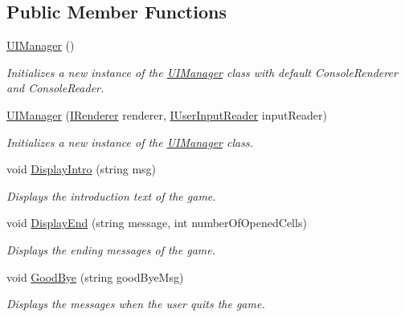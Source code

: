 \subsection*{Public Member Functions}
\begin{DoxyCompactItemize}
\item 
\hyperlink{class_minesweeper_1_1_game_1_1_u_i_manager_a424a2a585050b3c85d119d84c4ba2b80}{U\+I\+Manager} ()
\begin{DoxyCompactList}\small\item\em Initializes a new instance of the \hyperlink{class_minesweeper_1_1_game_1_1_u_i_manager}{U\+I\+Manager} class with default Console\+Renderer and Console\+Reader. \end{DoxyCompactList}\item 
\hyperlink{class_minesweeper_1_1_game_1_1_u_i_manager_a996444e4a3c298158ab07d21f48c7307}{U\+I\+Manager} (\hyperlink{interface_minesweeper_1_1_lib_1_1_i_renderer}{I\+Renderer} renderer, \hyperlink{interface_minesweeper_1_1_lib_1_1_i_user_input_reader}{I\+User\+Input\+Reader} input\+Reader)
\begin{DoxyCompactList}\small\item\em Initializes a new instance of the \hyperlink{class_minesweeper_1_1_game_1_1_u_i_manager}{U\+I\+Manager} class. \end{DoxyCompactList}\item 
void \hyperlink{class_minesweeper_1_1_game_1_1_u_i_manager_a854a5ddce1304981c194c0a98d1d9f8c}{Display\+Intro} (string msg)
\begin{DoxyCompactList}\small\item\em Displays the introduction text of the game. \end{DoxyCompactList}\item 
void \hyperlink{class_minesweeper_1_1_game_1_1_u_i_manager_a32460cc4c19947d1b2f0724a11c1d47c}{Display\+End} (string message, int number\+Of\+Opened\+Cells)
\begin{DoxyCompactList}\small\item\em Displays the ending messages of the game. \end{DoxyCompactList}\item 
void \hyperlink{class_minesweeper_1_1_game_1_1_u_i_manager_a8ff1e458e0f14038b0abb9a44fa078a6}{Good\+Bye} (string good\+Bye\+Msg)
\begin{DoxyCompactList}\small\item\em Displays the messages when the user quits the game. \end{DoxyCompactList}\item 

\end{DoxyCompactItemize}
